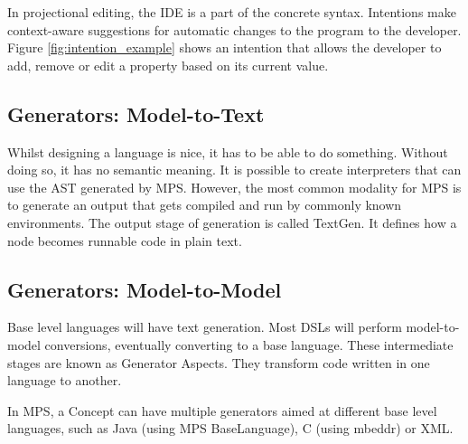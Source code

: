 In projectional editing, the IDE is a part of the concrete syntax.
Intentions make context-aware suggestions for automatic changes to the program to the developer.
Figure \ref{fig:intention_example} shows an intention that allows the developer to add, remove or edit a property based on its current value.

\subsection{Generators: Model-to-Text}
Whilst designing a language is nice, it has to be able to do something. 
Without doing so, it has no semantic meaning.
It is possible to create interpreters that can use the AST generated by MPS.
However, the most common modality for MPS is to generate an output that gets compiled and run by commonly known environments.
The output stage of generation is called TextGen.
It defines how a node becomes runnable code in plain text.

\subsection{Generators: Model-to-Model}
Base level languages will have text generation.
Most DSLs will perform model-to-model conversions, eventually converting to a base language.
These intermediate stages are known as Generator Aspects.
They transform code written in one language to another.

In MPS, a Concept can have multiple generators aimed at different base level languages, such as Java (using MPS BaseLanguage), C (using mbeddr) or XML.